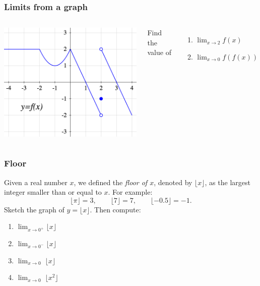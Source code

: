 \documentclass[14pt]{beamer}
\newcommand {\DS} [1] {${\displaystyle #1}$}
\newcommand{\p}{\pause}
\newcommand{\floor}[1]{\lfloor #1 \rfloor}
\begin{document}
\begin{frame}
\frametitle{Limits from a graph}

\begin{columns}[c]


\includegraphics[scale=.4]{G1}

Find the value of 
\begin{enumerate}
	\item  \DS{\lim_{x \to 2} f(x)}
	\item  \DS{\lim_{x \to 0} f(f(x))}
\end{enumerate}
\end{columns}

\end{frame}
\begin{frame}[t]
\frametitle{Floor}

Given a real number $x$, we defined the \emph{floor of $x$}, denoted by $\floor{x}$, as the largest integer smaller than or equal to $x$.  For example:
	$$
	 	\floor{\pi} = 3, \quad \quad \floor{7}=7, \quad \quad \floor{-0.5}=-1.
	$$
Sketch the graph of \DS{y = \floor{x}}.  Then compute:	 	
\begin{multicols}{2}
		\begin{enumerate}
			\item \DS{\lim_{x \to 0^+} \floor{x}}
			\item \DS{\lim_{x \to 0^-} \floor{x}}
			\item \DS{\lim_{x \to 0} \; \floor{x}}
			\item \DS{\lim_{x \to 0} \; \floor{x^2}}
		\end{enumerate}
\end{multicols}

\end{frame}
\end{document}
